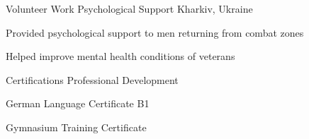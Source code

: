 
\begin{cventries}

\cventry
{Volunteer Work} %
{Psychological Support} %
{Kharkiv, Ukraine} %
{} %
{ %
\begin{cvitems}
\item {Provided psychological support to men returning from combat zones}
\item {Helped improve mental health conditions of veterans}
\end{cvitems}
}

\cventry
{Certifications} %
{Professional Development} %
{} %
{} %
{ %
\begin{cvitems}
\item {German Language Certificate B1}
\item {Gymnasium Training Certificate}
\end{cvitems}
}

\end{cventries} 